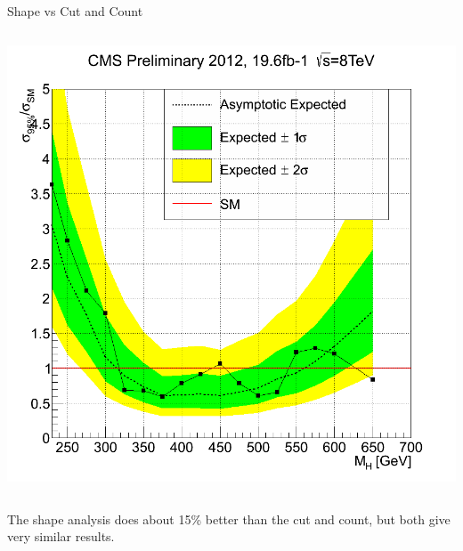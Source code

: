 \begin{frame}{Shape vs Cut and Count}
\begin{center}
\begin{columns}
\begin{column}{0.5\textwidth}
\begin{center}
    \includegraphics[width=1.\textwidth]{images/cutcount.png}
    \end{center}
  \end{column}
\end{columns}

\end{center}
\footnotesize
The shape analysis does about 15\% better than the cut and count, but both give very similar results.  

\end{frame}





